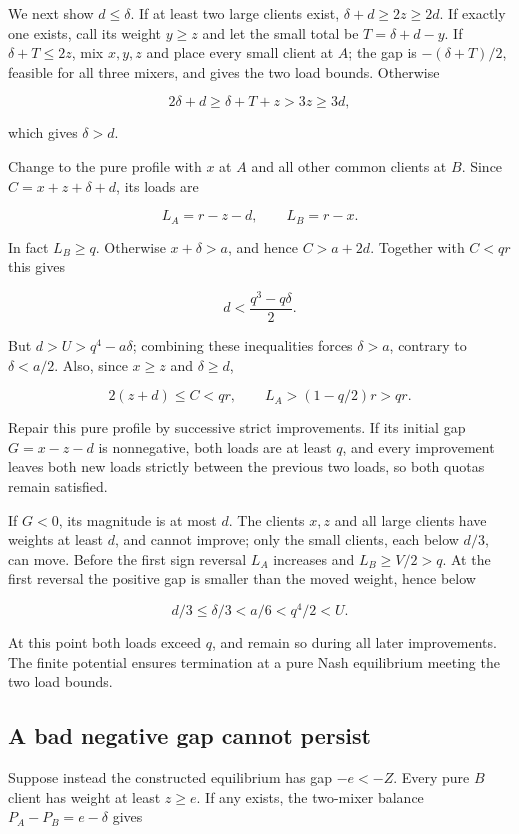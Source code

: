 \documentclass[11pt]{amsart}
\numberwithin{equation}{section}
\theoremstyle{definition}
\begin{document}
We next show \(d\le\delta\). If at least two large clients exist, \(\delta+d\ge2z\ge2d\). If exactly one exists, call its weight \(y\ge z\) and let the small total be \(T=\delta+d-y\). If \(\delta+T\le2z\), mix \(x,y,z\) and place every small client at \(A\); the gap is \(-(\delta+T)/2\), feasible for all three mixers, and gives the two load bounds. Otherwise

\[
2\delta+d\ge\delta+T+z>3z\ge3d,
\]

which gives \(\delta>d\).

Change to the pure profile with \(x\) at \(A\) and all other common clients at \(B\). Since \(C=x+z+\delta+d\), its loads are

\[
L_A=r-z-d,\qquad L_B=r-x.
\]

In fact \(L_B\ge q\). Otherwise \(x+\delta>a\), and hence \(C>a+2d\). Together with \(C<qr\) this gives

\[
d<\frac{q^3-q\delta}{2}.
\]

But \(d>U>q^4-a\delta\); combining these inequalities forces \(\delta>a\), contrary to \(\delta<a/2\). Also, since \(x\ge z\) and \(\delta\ge d\),

\[
2(z+d)\le C<qr,
\qquad L_A>(1-q/2)r>qr.
\]

Repair this pure profile by successive strict improvements. If its initial gap \(G=x-z-d\) is nonnegative, both loads are at least \(q\), and every improvement leaves both new loads strictly between the previous two loads, so both quotas remain satisfied.

If \(G<0\), its magnitude is at most \(d\). The clients \(x,z\) and all large clients have weights at least \(d\), and cannot improve; only the small clients, each below \(d/3\), can move. Before the first sign reversal \(L_A\) increases and \(L_B\ge V/2>q\). At the first reversal the positive gap is smaller than the moved weight, hence below

\[
d/3\le\delta/3<a/6<q^4/2<U.
\]

At this point both loads exceed \(q\), and remain so during all later improvements. The finite potential ensures termination at a pure Nash equilibrium meeting the two load bounds.


\subsection{A bad negative gap cannot persist}\label{a-bad-negative-gap-cannot-persist}

Suppose instead the constructed equilibrium has gap \(-e<-Z\). Every pure \(B\) client has weight at least \(z\ge e\). If any exists, the two-mixer balance \(P_A-P_B=e-\delta\) gives
\end{document}
